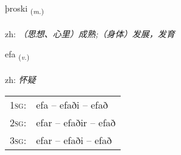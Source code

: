 \documentclass[frontgrid, backgrid]{flacards}\usepackage[]{graphicx}\usepackage[]{color}
\begin{document}
\renewcommand{\flhead}{\vskip5pt \fboxsep=0pt {\small\bfseries\footnotesize Nafnorð | 名词}}
\renewcommand{\fcfoot}{\vskip5pt \fboxsep=0pt \hspace{2pt}{\small\bfseries\footnotesize 2K}}

\renewcommand{\blhead}{\vskip5pt {\small\bfseries\footnotesize Nafnorð | 名词 }}
\renewcommand{\bcfoot}{\vskip5pt \hspace{2pt}{\small\bfseries\footnotesize 2K}}


{þroski \small{\textsubscript{(\textit{m.})}} \\[1ex] %
\textphonetic{[θrɔscɪ]} \\
zh: \emph{（思想、心里）成熟;（身体）发展，发育} \\  [2ex]
\renewcommand*{\arraystretch}{0.8}
}

\renewcommand{\flhead}{\vskip5pt \fboxsep=0pt {\small\bfseries\footnotesize Sagnorð | 动词}}
\renewcommand{\fcfoot}{\vskip5pt \fboxsep=0pt \hspace{2pt}{\small\bfseries\footnotesize 2K}}

\renewcommand{\blhead}{\vskip5pt {\small\bfseries\footnotesize Sagnorð | 动词 }}
\renewcommand{\bcfoot}{\vskip5pt \hspace{2pt}{\small\bfseries\footnotesize 2K}}


{efa \small{\textsubscript{(\textit{v.})}} \\[1ex] %
\textphonetic{[ɛːva]} \\
zh: \emph{怀疑} \\  [2ex]
\renewcommand*{\arraystretch}{0.8}
\begin{tabular}{p{1cm}l}
\textsc{1sg}: & efa -- efaði -- efað \\ 
\textsc{2sg}: & efar -- efaðir -- efað \\ 
\textsc{3sg}: & efar -- efaði -- efað \\ 
\end{tabular}
}
\end{document}
